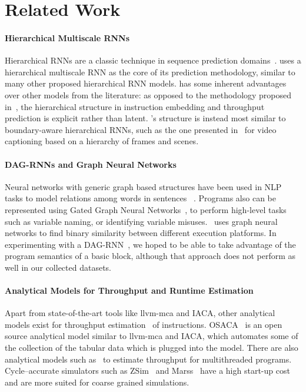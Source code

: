\section{Related Work}

\paragraph{Hierarchical Multiscale RNNs}
Hierarchical RNNs are a classic technique in sequence prediction domains~\cite{hihi-hierarchical}.
\tool{} uses a hierarchical multiscale RNN as the core of its prediction methodology, similar to many other proposed hierarchical RNN models.
\tool{} has some inherent advantages over other models from the literature: as opposed to the methodology proposed in~\cite{chung-hierarchical}, the hierarchical structure in instruction embedding and throughput prediction is explicit rather than latent.
\tool{}'s structure is instead most similar to boundary-aware hierarchical RNNs, such as the one presented in~\cite{baraldi-hierarchical} for video captioning based on a hierarchy of frames and scenes.

\paragraph{DAG-RNNs and Graph Neural Networks}
Neural networks with generic graph based structures have been used in NLP tasks to model relations among words in sentences ~\cite{acl:rel-extraction, arxiv:rel-extraction}.
Programs also can be represented using Gated Graph Neural Networks~\cite{ggnn}, to perform high-level tasks such as variable naming, or identifying variable misuses.
\citet{binary-similarity}~uses graph neural networks to find binary similarity between different execution platforms.
In experimenting with a DAG-RNN~\cite{dag-rnn1,dag-rnn2}, we hoped to be able to take advantage of the program semantics of a basic block, although that approach does not perform as well in our collected datasets.

\paragraph{Analytical Models for Throughput and Runtime Estimation}

Apart from state-of-the-art tools like llvm-mca and IACA, other analytical models exist for throughput estimation~\cite{taha-tp} of instructions.
OSACA~\cite{laukemann-osaca} is an open source analytical model similar to llvm-mca and IACA, which automates some of the collection of the tabular data which is plugged into the model.
There are also analytical models such as~\cite{chen-tp-multi} to estimate throughput for multithreaded programs.
Cycle--accurate simulators such as ZSim~\cite{sanchez-sim} and Marss~\cite{marss-sim} have a high start-up cost and are more suited for coarse grained simulations.

